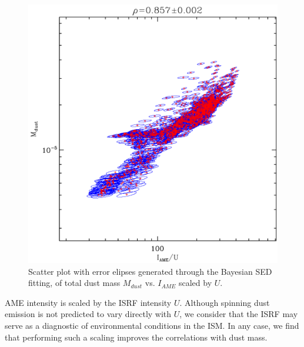                 \begin{figure}
                 \includegraphics[width=\textwidth/2]{../Plots/ch_lori/fred_LOri_notes_Oct2017_fig2a.pdf}
                 \centering
                 \caption{Scatter plot with error elipses generated through the Bayesian SED fitting, of total dust mass $M_{dust}$ vs. $I_{AME}$ scaled by $U$.}
                 \label{fig:fred_LOri_notes_Oct2017_fig2a}
               \end{figure}

           AME intensity is scaled by the ISRF intensity $U$. Although spinning dust emission is not predicted to vary directly with $U$, we consider that the ISRF may serve as a diagnostic of environmental conditions in the ISM. In any case, we find that performing such a scaling improves the correlations with dust mass.

